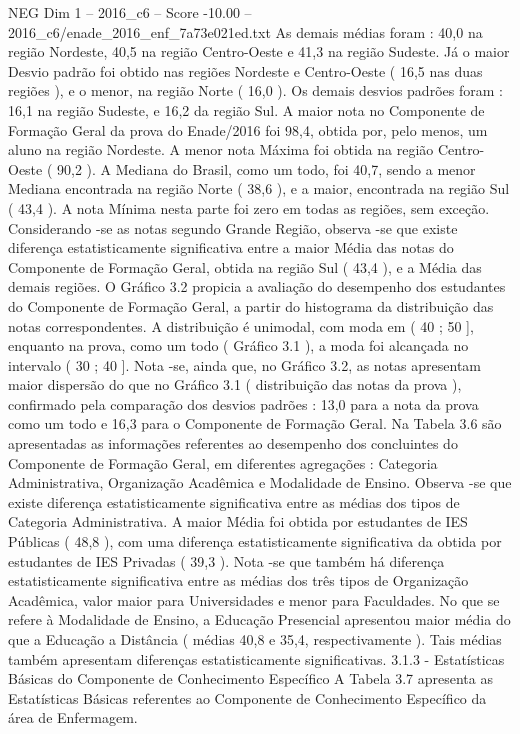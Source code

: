 \begin{textsample}{NEG Dim 1 – 2016\_c6 – Score -10.00 – 2016\_c6/enade\_2016\_enf\_7a73e021ed.txt}
As demais médias foram : 40,0 na região Nordeste, 40,5 na região Centro-Oeste e 41,3 na região Sudeste.
Já o maior Desvio padrão foi obtido nas regiões Nordeste e Centro-Oeste ( 16,5 nas duas regiões ), e o menor, na região Norte ( 16,0 ).
Os demais desvios padrões foram : 16,1 na região Sudeste, e 16,2 da região Sul.
A maior nota no Componente de Formação Geral da prova do Enade/2016 foi 98,4, obtida por, pelo menos, um aluno na região Nordeste.
A menor nota Máxima foi obtida na região Centro-Oeste ( 90,2 ).
A Mediana do Brasil, como um todo, foi 40,7, sendo a menor Mediana encontrada na região Norte ( 38,6 ), e a maior, encontrada na região Sul ( 43,4 ).
A nota Mínima nesta parte foi zero em todas as regiões, sem exceção.
Considerando -se as notas segundo Grande Região, observa -se que existe diferença estatisticamente significativa entre a maior Média das notas do Componente de Formação Geral, obtida na região Sul ( 43,4 ), e a Média das demais regiões.
O Gráfico 3.2 propicia a avaliação do desempenho dos estudantes do Componente de Formação Geral, a partir do histograma da distribuição das notas correspondentes.
A distribuição é unimodal, com moda em ( 40 ; 50 ], enquanto na prova, como um todo ( Gráfico 3.1 ), a moda foi alcançada no intervalo ( 30 ; 40 ].
Nota -se, ainda que, no Gráfico 3.2, as notas apresentam maior dispersão do que no Gráfico 3.1 ( distribuição das notas da prova ), confirmado pela comparação dos desvios padrões : 13,0 para a nota da prova como um todo e 16,3 para o Componente de Formação Geral.
Na Tabela 3.6 são apresentadas as informações referentes ao desempenho dos concluintes do Componente de Formação Geral, em diferentes agregações : Categoria Administrativa, Organização Acadêmica e Modalidade de Ensino.
Observa -se que existe diferença estatisticamente significativa entre as médias dos tipos de Categoria Administrativa.
A maior Média foi obtida por estudantes de IES Públicas ( 48,8 ), com uma diferença estatisticamente significativa da obtida por estudantes de IES Privadas ( 39,3 ).
Nota -se que também há diferença estatisticamente significativa entre as médias dos três tipos de Organização Acadêmica, valor maior para Universidades e menor para Faculdades.
No que se refere à Modalidade de Ensino, a Educação Presencial apresentou maior média do que a Educação a Distância ( médias 40,8 e 35,4, respectivamente ).
Tais médias também apresentam diferenças estatisticamente significativas. 3.1.3 - Estatísticas Básicas do Componente de Conhecimento Específico A Tabela 3.7 apresenta as Estatísticas Básicas referentes ao Componente de Conhecimento Específico da área de Enfermagem.

\end{textsample}
